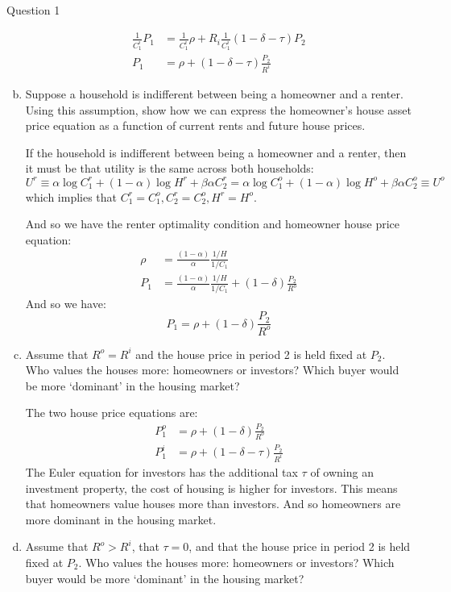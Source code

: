 \documentclass[a4paper]{article}
\newif\IfInSansMode
\begin{document}
\begin{questionbox}{Question 1}
\begin{enumerate}[(a)]
\begin{explanationbox}
\begin{align*}
				\frac{1}{C_1^i} P_1 &= \frac{1}{C_1^i}\rho + R_i\frac{1}{C_1^i}(1-\delta-\tau)P_2\\
				P_1 &= \rho + (1-\delta-\tau)\frac{P_2}{R^i}
			\end{align*}
			\end{explanationbox}
			\item Suppose a household is indifferent between being a homeowner and a renter. Using this assumption, show how we can express the homeowner's house asset price equation as a function of current rents and future house prices.
			\begin{explanationbox}
			If the household is indifferent between being a homeowner and a renter, then it must be that utility is the same across both households:
			\[
				U^r \equiv \alpha\log C_1^r + (1-\alpha)\log H^r + \beta\alpha C_2^r = \alpha\log C_1^o + (1-\alpha)\log H^o + \beta\alpha C_2^o \equiv U^o
			\]
			which implies that \( C_1^r = C_1^o, C_2^r = C_2^o, H^r = H^o \).
		\end{explanationbox}
		\begin{explanationbox}
			And so we have the renter optimality condition and homeowner house price equation:
			\begin{align*}
				\rho &=\frac{(1-\alpha)}{\alpha} \frac{1/H}{1/C_1} \\
				P_1 &= \frac{(1-\alpha)}{\alpha}\frac{1/H}{1/C_1}+(1-\delta)\frac{P_2}{R^o}
			\end{align*}
			And so we have:
			\[
			P_1 = \rho + (1 - \delta )\frac{P_2}{R^o}
			\]
			\end{explanationbox}
			\item Assume that \( R^o = R^i \) and the house price in period 2 is held fixed at \( P_2 \). Who values the houses more: homeowners or investors? Which buyer would be more `dominant' in the housing market?
			\begin{explanationbox}
			The two house price equations are:
			\begin{align*}
				P_1^o &= \rho + (1 - \delta )\frac{P_2}{R^o} \\
				P_1^i &= \rho + (1 - \delta - \tau )\frac{P_2}{R^i}
			\end{align*}
			The Euler equation for investors has the additional tax \( \tau \) of owning an investment property, the cost of housing is higher for investors. This means that homeowners value houses more than investors. And so homeowners are more dominant in the housing market.
			\end{explanationbox}
			\item Assume that \( R^o > R^i \), that \( \tau = 0 \), and that the house price in period 2 is held fixed at \( P_2 \). Who values the houses more: homeowners or investors? Which buyer would be more `dominant' in the housing market?

\end{enumerate}
\end{questionbox}
\end{document}
